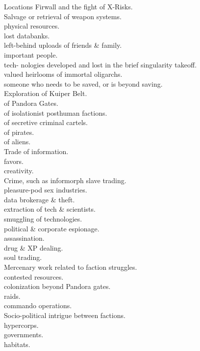 \documentclass[a4]{book}
\begin{document}
\begin{tableone}{Locations}
Firwall and the fight of X-Risks.\\
Salvage or retrieval of weapon systems.\\
\textellipsis physical resources.\\
\textellipsis lost databanks.\\
\textellipsis left-behind uploads of friends \& family.\\
\textellipsis important people.\\
\textellipsis tech- nologies developed and lost in the brief singularity takeoff.\\
\textellipsis valued heirlooms of immortal oligarchs.\\
\textellipsis someone who needs to be saved, or is beyond saving.\\
Exploration of Kuiper Belt.\\
\textellipsis of Pandora Gates.\\
\textellipsis of isolationist posthuman factions.\\
\textellipsis of secretive criminal cartels.\\
\textellipsis of pirates.\\
\textellipsis of aliens.\\
Trade of information.\\
\textellipsis favors.\\
\textellipsis creativity.\\
Crime, such as informorph slave trading.\\
\textellipsis pleasure-pod sex industries.\\
\textellipsis data brokerage \& theft.\\
\textellipsis extraction of tech \& scientists.\\
\textellipsis smuggling of technologies.\\
\textellipsis political \& corporate espionage.\\
\textellipsis assassination.\\
\textellipsis drug \& XP dealing.\\
\textellipsis soul trading.\\
Mercenary work related to faction struggles.\\
\textellipsis contested resources.\\
\textellipsis colonization beyond Pandora gates.\\
\textellipsis raids.\\
\textellipsis commando operations.\\
Socio-political intrigue between factions.\\
\textellipsis hypercorps.\\
\textellipsis governments.\\
\textellipsis habitats.\\
\end{tableone}
\end{document}
